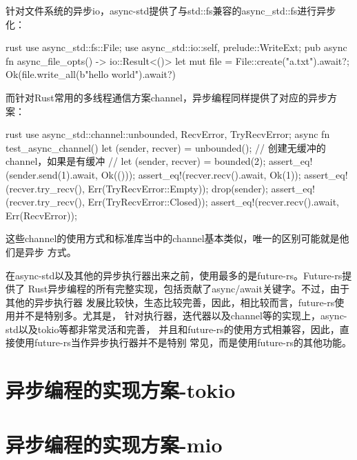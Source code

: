 针对文件系统的异步io，async-std提供了与std::fs兼容的async\_std::fs进行异步化：
\begin{code-block}{rust}
use async_std::fs::File;
use async_std::{io::{self, prelude::WriteExt}};
pub async fn async_file_opts() -> io::Result<()> {
    let mut file = File::create("a.txt").await?;
    Ok(file.write_all(b"hello world").await?)
}
\end{code-block}

而针对Rust常用的多线程通信方案channel，异步编程同样提供了对应的异步方案：
\begin{code-block}{rust}
use async_std::channel::{unbounded, RecvError, TryRecvError};
async fn test_async_channel() {
    let (sender, recver) = unbounded(); // 创建无缓冲的channel，如果是有缓冲
                                        // let (sender, recver) = bounded(2);
    assert_eq!(sender.send(1).await, Ok(()));
    assert_eq!(recver.recv().await, Ok(1));
    assert_eq!(recver.try_recv(), Err(TryRecvError::Empty));
    drop(sender);
    assert_eq!(recver.try_recv(), Err(TryRecvError::Closed));
    assert_eq!(recver.recv().await, Err(RecvError));
}
\end{code-block}
这些channel的使用方式和标准库当中的channel基本类似，唯一的区别可能就是他们是异步
方式。

\begin{note}
在async-std以及其他的异步执行器出来之前，使用最多的是future-rs。Future-rs提供了
Rust异步编程的所有完整实现，包括贡献了async/await关键字。不过，由于其他的异步执行器
发展比较快，生态比较完善，因此，相比较而言，future-rs使用并不是特别多。尤其是，
针对执行器，迭代器以及channel等的实现上，async-std以及tokio等都非常灵活和完善，
并且和future-rs的使用方式相兼容，因此，直接使用future-rs当作异步执行器并不是特别
常见，而是使用future-rs的其他功能。
\end{note}

\section{异步编程的实现方案-tokio}
\section{异步编程的实现方案-mio}

